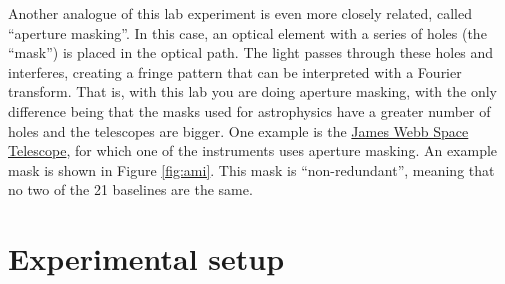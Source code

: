 \documentclass[11pt]{article}
\begin{document}
Another analogue of this lab experiment is even more closely related, called ``aperture masking''. In this case, an optical element with a series of holes (the ``mask'') is placed in the optical path. The light passes through these holes and interferes, creating a fringe pattern that can be interpreted with a Fourier transform. That is, with this lab you are doing aperture masking, with the only difference being that the masks used for astrophysics have a greater number of holes and the telescopes are bigger. One example is the \href{https://jwst-docs.stsci.edu/jwst-near-infrared-imager-and-slitless-spectrograph/niriss-observing-modes/niriss-aperture-masking-interferometry}{James Webb Space Telescope}, for which one of the instruments uses aperture masking. An example mask is shown in Figure \ref{fig:ami}. This mask is ``non-redundant'', meaning that no two of the 21 baselines are the same.

\clearpage
\section{Experimental setup}
\end{document}
